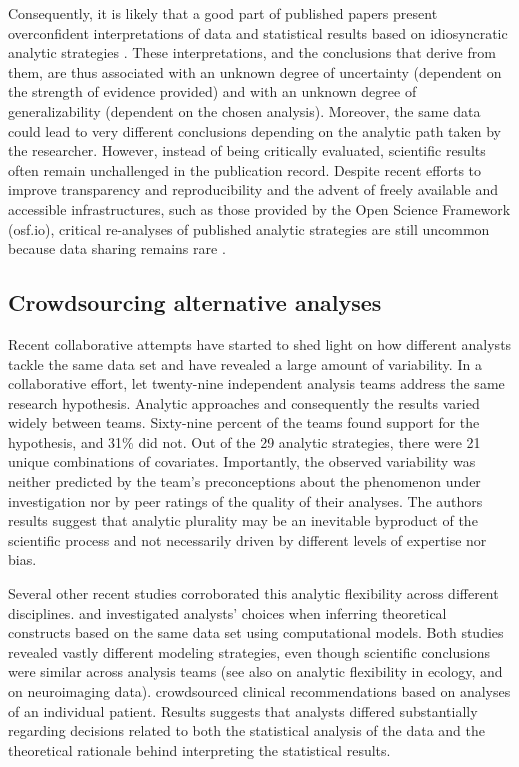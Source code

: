 \documentclass[Review,times,sageh]{sagej}
\begin{document}
Consequently, it is likely that a good part of published papers present overconfident interpretations of data and statistical results based on idiosyncratic analytic strategies \citep[e.g.,][]{simmons2011false, gelman2014statistical}.
These interpretations, and the conclusions that derive from them, are thus associated with an unknown degree of uncertainty (dependent on the strength of evidence provided) and with an unknown degree of generalizability (dependent on the chosen analysis).
Moreover, the same data could lead to very different conclusions depending on the analytic path taken by the researcher.
However, instead of being critically evaluated, scientific results often remain unchallenged in the publication record.
Despite recent efforts to improve transparency and reproducibility \citep[e.g.][]{miguel2014promoting, klein2018practical} and the advent of freely available and accessible infrastructures, such as those provided by the Open Science Framework (osf.io), critical re-analyses of published analytic strategies are still uncommon because data sharing remains rare \citep{wicherts2006poor}.

\hypertarget{crowdsourcing-alternative-analyses}{%
\subsection{Crowdsourcing alternative analyses}\label{crowdsourcing-alternative-analyses}}

Recent collaborative attempts have started to shed light on how different analysts tackle the same data set and have revealed a large amount of variability.
In a collaborative effort, \citet{silberzahn2018many} let twenty-nine independent analysis teams address the same research hypothesis.
Analytic approaches and consequently the results varied widely between teams.
Sixty-nine percent of the teams found support for the hypothesis, and 31\% did not.
Out of the 29 analytic strategies, there were 21 unique combinations of covariates.
Importantly, the observed variability was neither predicted by the team's preconceptions about the phenomenon under investigation nor by peer ratings of the quality of their analyses.
The authors results suggest that analytic plurality may be an inevitable byproduct of the scientific process and not necessarily driven by different levels of expertise nor bias.

Several other recent studies corroborated this analytic flexibility across different disciplines.
\citet{dutilh2019} and \citet{starns2019assessing} investigated analysts' choices when inferring theoretical constructs based on the same data set using computational models.
Both studies revealed vastly different modeling strategies, even though scientific conclusions were similar across analysis teams (see also \citet{Parker2020} on analytic flexibility in ecology, and \citet{botvinik-nezer2020} on neuroimaging data).
\citet{bastiaansen2020} crowdsourced clinical recommendations based on analyses of an individual patient.
Results suggests that analysts differed substantially regarding decisions related to both the statistical analysis of the data and the theoretical rationale behind interpreting the statistical results.
\end{document}
